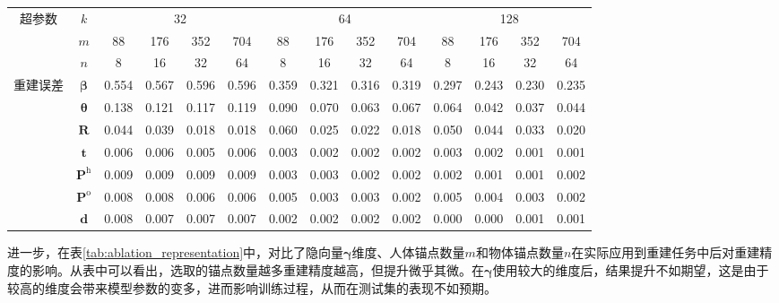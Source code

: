 \begin{table}[!htbp]
	\label{tab:ablation_anchor_num}
	\centering
	\footnotesize
	\setlength{\tabcolsep}{4pt}
	\renewcommand{\arraystretch}{1.2}
	\begin{tabular}{c|c|cccc|cccc|cccc}
		\toprule
		\multirow{3}{*}{超参数} & $k$ & \multicolumn{4}{c}{32} & \multicolumn{4}{c}{64} & \multicolumn{4}{c}{128} \\
		\cline{2-14}
		& $m$ & 88 & 176 & 352 & 704 & 88 & 176 & 352 & 704 & 88 & 176 & 352 & 704 \\
		& $n$ & 8 & 16 & 32 & 64 & 8 & 16 & 32 & 64 & 8 & 16 & 32 & 64 \\
		\hline
		\multirow{7}{*}{重建误差} & $\mathbf{\beta}$ & 0.554 & 0.567 & 0.596 & 0.596 & 0.359 & 0.321 & 0.316 & 0.319 & 0.297 & 0.243 & 0.230 & 0.235 \\
		& $\mathbf{\theta}$ & 0.138 & 0.121 & 0.117 & 0.119 & 0.090 & 0.070 & 0.063 & 0.067 & 0.064 & 0.042 & 0.037 & 0.044 \\
		& $\mathbf{R}$ & 0.044 & 0.039 & 0.018 & 0.018 & 0.060 & 0.025 & 0.022 & 0.018 & 0.050 & 0.044 & 0.033 & 0.020 \\
		& $\mathbf{t}$ & 0.006 & 0.006 & 0.005 & 0.006 & 0.003 & 0.002 & 0.002 & 0.002 & 0.003 & 0.002 & 0.001 & 0.001 \\
		& $\mathbf{P}^{\text{h}}$ & 0.009 & 0.009 & 0.009 & 0.009 & 0.003 & 0.003 & 0.002 & 0.002 & 0.002 & 0.001 & 0.001 & 0.002 \\
		& $\mathbf{P}^{\text{o}}$ & 0.008 & 0.008 & 0.006 & 0.006 & 0.005 & 0.003 & 0.003 & 0.002 & 0.005 & 0.004 & 0.003 & 0.002 \\
		& $\mathbf{d}$ & 0.008 & 0.007 & 0.007 & 0.007 & 0.002 & 0.002 & 0.002 & 0.002 & 0.000 & 0.000 & 0.001 & 0.001 \\
		\bottomrule
	\end{tabular}
\end{table}

进一步，在表\ref{tab:ablation_representation}中，对比了隐向量$\mathbf{\gamma}$维度、人体锚点数量$m$和物体锚点数量$n$在实际应用到重建任务中后对重建精度的影响。从表中可以看出，选取的锚点数量越多重建精度越高，但提升微乎其微。在$\mathbf{\gamma}$使用较大的维度后，结果提升不如期望，这是由于较高的维度会带来模型参数的变多，进而影响训练过程，从而在测试集的表现不如预期。

